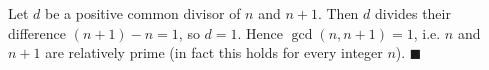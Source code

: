 Let \(d\) be a positive common divisor of \(n\) and \(n+1\). Then \(d\) divides their difference \((n+1)-n=1\), so \(d=1\). Hence \(\gcd(n,n+1)=1\), i.e. \(n\) and \(n+1\) are relatively prime (in fact this holds for every integer \(n\)). \(\blacksquare\)
